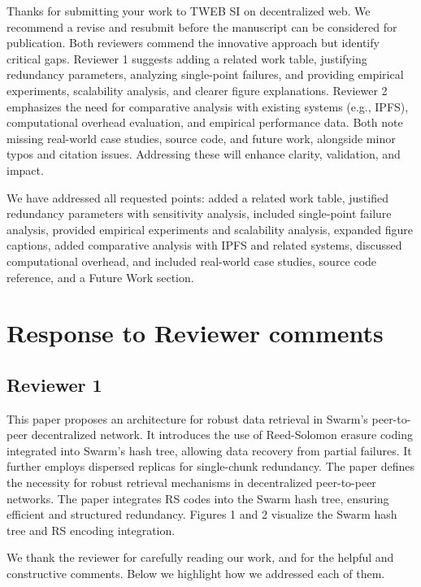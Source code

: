 \documentclass[11pt]{article}
\newcommand{\us}{\rm \setlength{\leftskip}{0.3cm} \setlength{\rightskip}{0.3cm}}
\newcommand{\them}{\it \setlength{\leftskip}{0cm} \setlength{\rightskip}{0cm}}
\begin{document}
Thanks for submitting your work to TWEB SI on decentralized web. We recommend a revise and resubmit before the manuscript can be considered for publication. Both reviewers commend the innovative approach but identify critical gaps. Reviewer 1 suggests adding a related work table, justifying redundancy parameters, analyzing single-point failures, and providing empirical experiments, scalability analysis, and clearer figure explanations. Reviewer 2 emphasizes the need for comparative analysis with existing systems (e.g., IPFS), computational overhead evaluation, and empirical performance data. Both note missing real-world case studies, source code, and future work, alongside minor typos and citation issues. Addressing these will enhance clarity, validation, and impact.

\us
We have addressed all requested points: added a related work table, justified redundancy parameters with sensitivity analysis, included single-point failure analysis, provided empirical experiments and scalability analysis, expanded figure captions, added comparative analysis with IPFS and related systems, discussed computational overhead, and included real-world case studies, source code reference, and a Future Work section.

\them


\section*{Response to Reviewer comments}

\subsection*{Reviewer 1}

\them

This paper proposes an architecture for robust data retrieval in Swarm's peer-to-peer decentralized network. It introduces the use of Reed-Solomon erasure coding integrated into Swarm's hash tree, allowing data recovery from partial failures. It further employs dispersed replicas for single-chunk redundancy. The paper defines the necessity for robust retrieval mechanisms in decentralized peer-to-peer networks. The paper integrates RS codes into the Swarm hash tree, ensuring efficient and structured redundancy. Figures 1 and 2 visualize the Swarm hash tree and RS encoding integration.

\us
We thank the reviewer for carefully reading our work, and for the helpful and constructive comments. Below we highlight how we addressed each of them.
\end{document}
